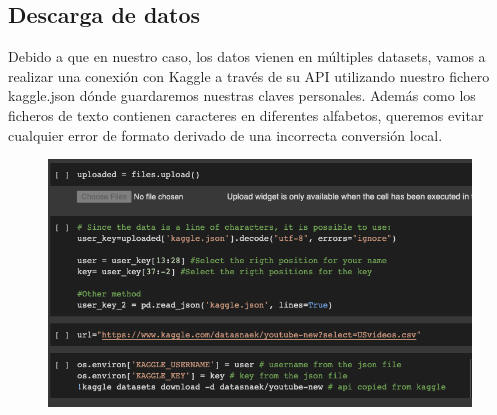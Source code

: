\documentclass[a4paper,12pt]{article}
\begin{document}
\subsection{Descarga de datos}
Debido a que en nuestro caso, los datos vienen en m\'ultiples datasets, vamos a realizar una conexi\'on con Kaggle a trav\'es de su API utilizando nuestro fichero kaggle.json d\'onde guardaremos nuestras claves personales. Adem\'as como los ficheros de texto contienen caracteres en diferentes alfabetos, queremos evitar cualquier error de formato derivado de una incorrecta conversi\'on local.

\begin{figure}[h!]
 \centering
\includegraphics[width=13cm]{kaggle_upload.png}
\end{figure}
\end{document}
